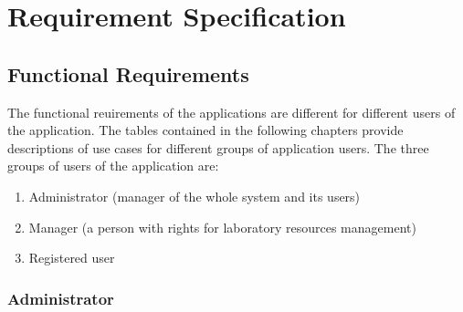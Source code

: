\documentclass[a4paper,11pt,twoside]{report}
\theoremstyle{definition}
\begin{document}

\chapter{Requirement Specification}



\section{Functional Requirements}

The functional reuirements of the applications are different for different users of the application. The tables contained in the following chapters provide descriptions of use cases for different groups of application users.
The three groups of users of the application are:
\begin{enumerate}

\item Administrator (manager of the whole system and its users)
\item Manager (a person with rights for laboratory resources management)
\item Registered user

\end{enumerate}

\subsection{Administrator}
\end{document}
